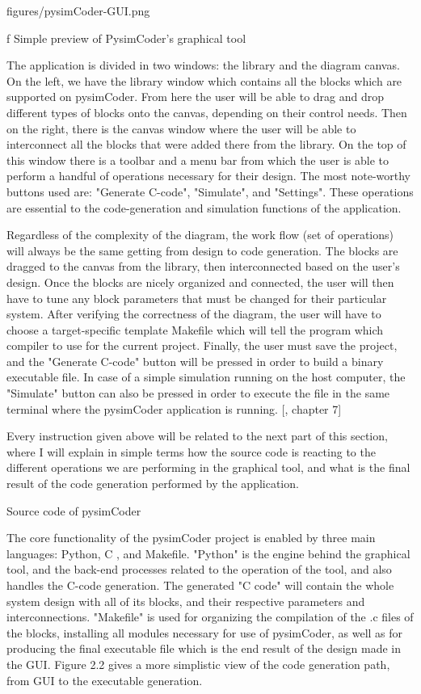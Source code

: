 \medskip {}
\picw=12cm \cinspic figures/pysimCoder-GUI.png
\caption/f Simple preview of PysimCoder's graphical tool
\medskip

\quad The application is divided in two windows: the library and the diagram canvas. On the left, we have the library window 
which contains all the blocks which are supported on pysimCoder. From here the user will be able to drag and drop different 
types of blocks onto the canvas, depending on their control needs. Then on the right, there is the canvas window where the user 
will be able to interconnect all the blocks that were added there from the library. On the top of this window there is a toolbar
and a menu bar from which the user is able to perform a handful of operations necessary for their design. The most note-worthy
buttons used are: "Generate C-code", "Simulate", and "Settings". These operations are essential to the code-generation and
simulation functions of the application.

\quad Regardless of the complexity of the diagram, the work flow (set of operations) will always be the same getting from design 
to code generation. The blocks are dragged to the canvas from the library, then interconnected based on the user's design. 
Once the blocks are nicely organized and connected, the user will then have to tune any block parameters that must be changed for
their particular system. After verifying the correctness of the diagram, the user will have to choose a target-specific template
Makefile which will tell the program which compiler to use for the current project. Finally, the user must save the project, and
the "Generate C-code" button will be pressed in order to build a binary executable file. In case of a simple simulation running
on the host computer, the "Simulate" button can also be pressed in order to execute the file in the same terminal where the
pysimCoder application is running. [, chapter 7]

\quad Every instruction given above will be related to the next part of this section, where I will explain in simple terms
how the source code is reacting to the different operations we are performing in the graphical tool, and what is the final result
of the code generation performed by the application. 


\secc Source code of pysimCoder

\qquad The core functionality of the pysimCoder project is enabled  by three main languages: Python, C , and Makefile. 
"Python" is the engine behind the graphical tool, and the back-end processes related to the operation of the tool, and also handles the
C-code generation. The generated "C code" will contain the whole system design with all of its blocks, and their respective parameters
and interconnections. "Makefile" is used for organizing the compilation of the .c files of the blocks, installing all modules
necessary for use of pysimCoder, as well as for producing the final executable file which is the end result of the design made in the
GUI. Figure 2.2 gives a more simplistic view of the code generation path, from GUI to the executable generation. 

